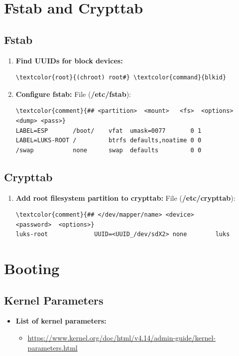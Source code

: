 \documentclass[10pt, a4paper, onecolumn, oneside, titlepage, openany]{book}
\begin{document}
\section{Fstab and Crypttab}
\subsection{Fstab}
\begin{enumerate}
    \item \textbf{Find UUIDs for block devices:}
\begin{Verbatim}[commandchars=\\\{\}]
\textcolor{root}{(chroot) root#} \textcolor{command}{blkid}
\end{Verbatim}
    \item \textbf{Configure fstab:}
\newline File (\textbf{\textcolor{file}{/etc/fstab}}):
\begin{Verbatim}[commandchars=\\\{\}]
\textcolor{comment}{## <partition>  <mount>   <fs>  <options>        <dump> <pass>}
LABEL=ESP       /boot/    vfat  umask=0077       0 1
LABEL=LUKS-ROOT /         btrfs defaults,noatime 0 0
/swap           none      swap  defaults         0 0
\end{Verbatim}
\end{enumerate}
\subsection{Crypttab}
\begin{enumerate}
    \item \textbf{Add root filesystem partition to crypttab:}
\newline File (\textbf{\textcolor{file}{/etc/crypttab}}):
\begin{Verbatim}[commandchars=\\\{\}]
\textcolor{comment}{## </dev/mapper/name> <device>              <password>  <options>}
luks-root             UUID=<UUID_/dev/sdX2> none        luks
\end{Verbatim}
\end{enumerate}

\section{Booting}
\subsection{Kernel Parameters}
\begin{itemize}
    \item \textbf{List of kernel parameters:}
    \begin{itemize}
        \item \url{https://www.kernel.org/doc/html/v4.14/admin-guide/kernel-parameters.html}
    \end{itemize}
\end{itemize}
\end{document}
